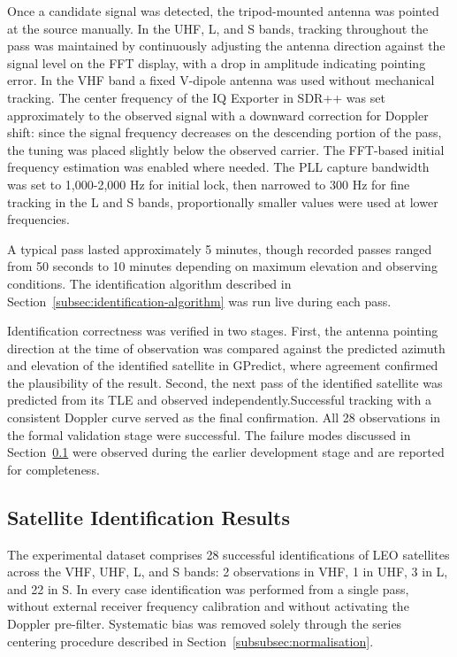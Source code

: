 \documentclass[lineno,pdflatex,sn-basic,referee,]{sn-jnl}
\begin{document}
Once a candidate signal was detected, the tripod-mounted antenna was pointed at the source manually. In the UHF, L, and S bands, tracking throughout the pass was maintained by continuously adjusting the antenna direction against the signal level on the FFT display, with a drop in amplitude indicating pointing error. In the VHF band a fixed V-dipole antenna was used without mechanical tracking. The center frequency of the IQ Exporter in SDR++ was set approximately to the observed signal with a downward correction for Doppler shift: since the signal frequency decreases on the descending portion of the pass, the tuning was placed slightly below the observed carrier. The FFT-based initial frequency estimation was enabled where needed. The PLL capture bandwidth was set to 1,000-2,000 Hz for initial lock, then narrowed to 300 Hz for fine tracking in the L and S bands, proportionally smaller values were used at lower frequencies.

A typical pass lasted approximately 5 minutes, though recorded passes ranged from 50 seconds to 10 minutes depending on maximum elevation and observing conditions. The identification algorithm described in Section~\ref{subsec:identification-algorithm} was run live during each pass.

Identification correctness was verified in two stages. First, the antenna pointing direction at the time of observation was compared against the predicted azimuth and elevation of the identified satellite in GPredict, where agreement confirmed the plausibility of the result. Second, the next pass of the identified satellite was predicted from its TLE and observed independently.Successful tracking with a consistent Doppler curve served as the final confirmation. All 28 observations in the formal validation stage were successful. The failure modes discussed in Section~\ref{subsec:results} were observed during the earlier development stage and are reported for completeness.


\subsection{Satellite Identification Results}
\label{subsec:results}

The experimental dataset comprises 28 successful identifications of LEO satellites across the VHF, UHF, L, and S bands: 2 observations in VHF, 1 in UHF, 3 in L, and 22 in S. In every case identification was performed from a single pass, without external receiver frequency calibration and without activating the Doppler pre-filter. Systematic bias was removed solely through the series centering procedure described in Section~\ref{subsubsec:normalisation}. 
\end{document}
